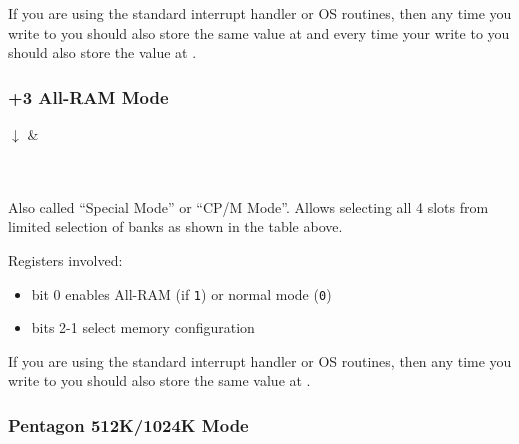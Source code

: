 If you are using the standard interrupt handler or OS routines, then any time you write to  you should also store the same value at  and every time your write to  you should also store the value at .


\subsubsection{+3 All-RAM Mode}

\begin{PagingTableLegacy}
	\PagingTableLegacyItem{}{$\uparrow$}{$\uparrow$}{$\uparrow$}{$\uparrow$}
	$\downarrow$ & \\
	 \\
	 \\
\end{PagingTableLegacy}

Also called ``Special Mode'' or ``CP/M Mode''. Allows selecting all 4 slots from limited selection of banks as shown in the table above.

Registers involved:

\begin{itemize}[topsep=0pt,itemsep=0pt]
	\item {} bit 0 enables All-RAM (if {\tt 1}) or normal mode ({\tt 0})
	\item {} bits 2-1 select memory configuration
\end{itemize}

If you are using the standard interrupt handler or OS routines, then any time you write to  you should also store the same value at .


\subsubsection{Pentagon 512K/1024K Mode}

